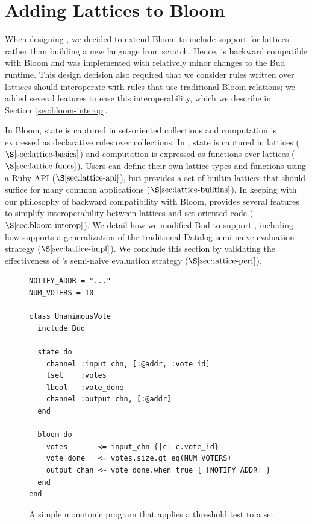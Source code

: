 \section{Adding Lattices to Bloom}
\label{sec:impl}



When designing \lang, we decided to extend Bloom to include support for
lattices rather than building a new language from scratch. Hence, \lang is
backward compatible with Bloom and was implemented with relatively minor
changes to the Bud runtime. This design decision also required that we consider
rules written over lattices should interoperate with rules that use traditional
Bloom relations; we added several \lang features to ease this interoperability,
which we describe in Section~\ref{sec:bloom-interop}.

In Bloom, state is captured in set-oriented collections and computation is
expressed as declarative rules over collections. In \lang, state is captured in
lattices ($\S \ref{sec:lattice-basics}$) and computation is expressed as
functions over lattices ($\S \ref{sec:lattice-funcs}$). Users can define their
own lattice types and functions using a Ruby API ($\S \ref{sec:lattice-api}$),
but \lang provides a set of builtin lattices that should suffice for many common
applications ($\S \ref{sec:lattice-builtins}$). In keeping with our philosophy
of backward compatibility with Bloom, \lang provides several features to
simplify interoperability between lattices and set-oriented code ($\S
\ref{sec:bloom-interop}$). We detail how we modified Bud to support \lang,
including how \lang supports a generalization of the traditional Datalog
semi-naive evaluation strategy ($\S \ref{sec:lattice-impl}$). We conclude this
section by validating the effectiveness of \lang's semi-naive evaluation strategy
($\S \ref{sec:lattice-perf}$).

\begin{figure}[t]
\begin{scriptsize}
\begin{lstlisting}
NOTIFY_ADDR = "..."
NUM_VOTERS = 10

class UnanimousVote
  include Bud

  state do
    channel :input_chn, [:@addr, :vote_id]
    lset    :votes
    lbool   :vote_done
    channel :output_chn, [:@addr]
  end

  bloom do
    votes       <= input_chn {|c| c.vote_id}
    vote_done   <= votes.size.gt_eq(NUM_VOTERS)
    output_chan <~ vote_done.when_true { [NOTIFY_ADDR] }
  end
end
\end{lstlisting}
\end{scriptsize}
\caption{A simple monotonic \lang program that applies a threshold test to a
  set.}
\label{fig:lattice-ex1}
\end{figure}

